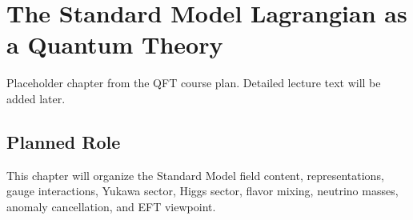 \chapter{The Standard Model Lagrangian as a Quantum Theory}

\begin{remarkbox}
Placeholder chapter from the QFT course plan. Detailed lecture text will be added later.
\end{remarkbox}

\section{Planned Role}

This chapter will organize the Standard Model field content, representations, gauge interactions, Yukawa sector, Higgs sector, flavor mixing, neutrino masses, anomaly cancellation, and EFT viewpoint.
